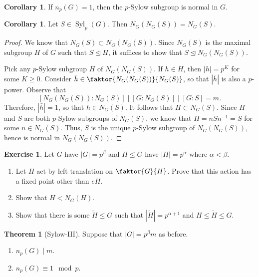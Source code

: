\documentclass[10pt,letterpaper,cm]{nupset}
\theoremstyle{definition}
\theoremstyle{theorem}
\newtheorem{theorem}[definition]{Theorem}
\newtheorem{corollary}[definition]{Corollary}
\newtheorem{exercise}[definition]{Exercise}
\theoremstyle{remark}
\newcommand{\1}{\mathbf{1}}
\newcommand{\0}{\vec 0}
\DeclareMathOperator{\Syl}{Syl}
\begin{document}
\begin{corollary}
If $n_p(G)=1$, then the $p$-Sylow subgroup is normal in $G$.
\end{corollary}

\begin{corollary}
Let $S\in \Syl_p(G)$. Then $N_G(N_G(S)) = N_G(S)$.
\end{corollary}

\begin{proof}
We know that $N_G(S) \subset N_G(N_G(S))$. Since $N_G(S)$ is the maximal subgroup $H$ of $G$ such that $S\unlhd H$, it suffices to show that $S\unlhd N_G(N_G(S))$.

Pick any $p$-Sylow subgroup $H$ of $N_G(N_G(S))$. If $h\in H$, then $\left\lvert{h}\right\rvert =p^K$ for some $K\geq 0$. Consider $\bar{h} \in \faktor{N_G(N_G(S))}{N_G(S)}$, so that $\left\lvert{\bar{h}}\right\rvert$ is also a $p$-power. Observe that $$\left[N_G(N_G(S)): N_G(S)\right]\mid \left[G: N_G(S)\right] \mid \left[G:S\right]=m.$$ Therefore, $\left\lvert{\bar{h}}\right\rvert =1$, so that $h \in N_G(S)$. It follows that $H \subset N_G(S)$. Since $H$ and $S$ are both $p$-Sylow subgroups of $N_G(S)$, we know that $H = nSn^{-1} = S$ for some $n\in N_G(S)$. Thus, $S$ is the unique $p$-Sylow subgroup of $N_G(N_G(S))$, hence is normal in $N_G(N_G(S))$.
\end{proof}

\begin{exercise} Let $G$ have $\left\lvert{G}\right\rvert=p^{\beta}$ and $H\leq G$ have $\left\lvert{H}\right\rvert=p^{\alpha}$ where $\alpha < \beta$. 
\begin{enumerate}
\item Let $H$ act by left translation on $\faktor{G}{H}$. Prove that this action has a fixed point other than $eH$.
\item Show that $H < N_G(H)$.
\item Show that there is some $\tilde{H} \leq G$ such that $\left\lvert{\tilde{H}}\right\rvert =p^{\alpha+1}$ and $H \leq \tilde{H} \leq G$.
\end{enumerate}
\end{exercise}

\smallskip

\begin{theorem}[Sylow-III]
Suppose that $\left\lvert{G}\right\rvert= p^{\beta}m$ as before.
\begin{enumerate}[label=(\arabic*)]
\item $n_p(G) \mid m$.
\item $n_p(G) \equiv 1 \mod p$.
\end{enumerate}
\end{theorem}
\end{document}

